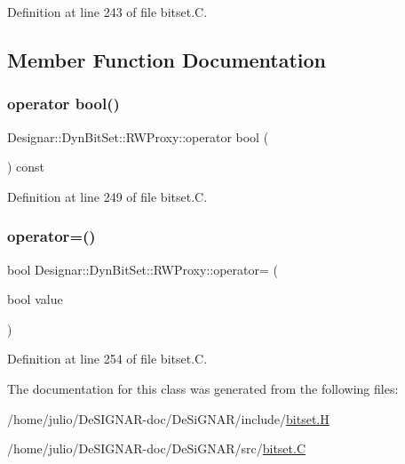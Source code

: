 Definition at line 243 of file bitset.\+C.



\subsection{Member Function Documentation}
\mbox{\label{class_designar_1_1_dyn_bit_set_1_1_r_w_proxy_ae2b7bc44f30f8b75d8fc2306167f9598}} 
\subsubsection{\texorpdfstring{operator bool()}{operator bool()}}
{\footnotesize\ttfamily Designar\+::\+Dyn\+Bit\+Set\+::\+R\+W\+Proxy\+::operator bool (\begin{DoxyParamCaption}{ }\end{DoxyParamCaption}) const}



Definition at line 249 of file bitset.\+C.

\mbox{\label{class_designar_1_1_dyn_bit_set_1_1_r_w_proxy_ad9dff242f5550a97af94c1e4ecd163ad}} 
\subsubsection{\texorpdfstring{operator=()}{operator=()}}
{\footnotesize\ttfamily bool Designar\+::\+Dyn\+Bit\+Set\+::\+R\+W\+Proxy\+::operator= (\begin{DoxyParamCaption}\item[{bool}]{value }\end{DoxyParamCaption})}



Definition at line 254 of file bitset.\+C.



The documentation for this class was generated from the following files\+:\begin{DoxyCompactItemize}
\item 
/home/julio/\+De\+S\+I\+G\+N\+A\+R-\/doc/\+De\+Si\+G\+N\+A\+R/include/\hyperlink{bitset_8_h}{bitset.\+H}\item 
/home/julio/\+De\+S\+I\+G\+N\+A\+R-\/doc/\+De\+Si\+G\+N\+A\+R/src/\hyperlink{bitset_8_c}{bitset.\+C}\end{DoxyCompactItemize}

